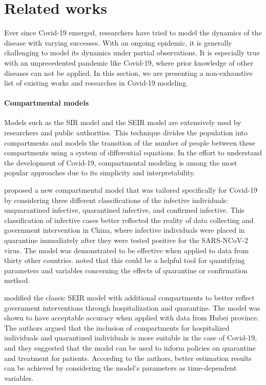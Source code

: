 \section{Related works}

Ever since Covid-19 emerged, researchers have tried to model the dynamics of the disease with varying successes.
With an ongoing epidemic, it is generally challenging to model its dynamics under partial observations.
It is especially true with an unprecedented pandemic like Covid-19, where prior knowledge of other diseases can not be applied.
In this section, we are presenting a non-exhaustive list of existing works and researches in Covid-19 modeling.

\paragraph{Compartmental models}
Models such as the SIR model and the SEIR model \cite{kermackContributionMathematicalTheory1927, kermackContributionsMathematicalTheory1932, kermackContributionsMathematicalTheory1933, brauerCompartmentalModelsEpidemiology2008} are extensively used by researchers and public authorities.
This technique divides the population into compartments and models the transition of the number of people between these compartments using a system of differential equations.
In the effort to understand the development of Covid-19, compartmental modeling is among the most popular approaches due to its simplicity and interpretability.

\citeauthor{zhaoModelingEpidemicDynamics2020} \cite{zhaoModelingEpidemicDynamics2020} proposed a new compartmental model that was tailored specifically for Covid-19 by considering three different classifications of the infective individuals: unquarantined infective, quarantined infective, and confirmed infective.
This classification of infective cases better reflected the reality of data collecting and government intervention in China, where infective individuals were placed in quarantine immediately after they were tested positive for the SARS-NCoV-2 virus.
The model was demonstrated to be effective when applied to data from thirty other countries.
\citeauthor{zhaoModelingEpidemicDynamics2020} noted that this could be a helpful tool for quantifying parameters and variables concerning the effects of quarantine or confirmation method.

\citeauthor{heSEIRModelingCOVID192020} \cite{heSEIRModelingCOVID192020} modified the classic SEIR model with additional compartments to better reflect government interventions through hospitalization and quarantine.
The model was shown to have acceptable accuracy when applied with data from Hubei province.
The authors argued that the inclusion of compartments for hospitalized individuals and quarantined individuals is more suitable in the case of Covid-19, and they suggested that the model can be used to inform policies on quarantine and treatment for patients.
According to the authors, better estimation results can be achieved by considering the model's parameters as time-dependent variables.


